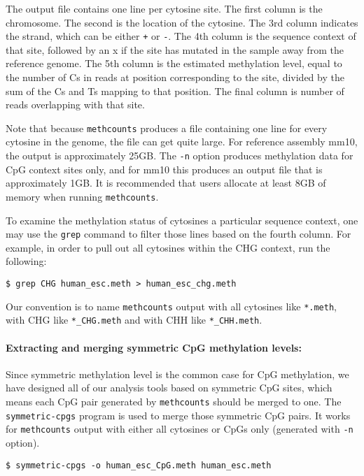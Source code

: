 \documentclass[10pt]{article}
\newcommand{\prog}[1]{\texttt{#1}}
\newcommand{\fn}[1]{\texttt{#1}}
\newcommand{\lit}[1]{\texttt{#1}}
\newcommand{\op}[1]{\texttt{#1}}
\begin{document}
The output file contains one line per cytosine site. The first column is
the chromosome. The second is the location of the cytosine. The 3rd column
indicates the strand, which can be either \lit{+} or \lit{-}. The 4th
column is the sequence context of that site, followed by an x if the
site has mutated in the sample away from the reference genome. The 5th
column is the estimated methylation level, equal to the number of Cs in
reads at position corresponding to the site, divided by the sum of the Cs
and Ts mapping to that position. The final column is number of reads
overlapping with that site.

Note that because \prog{methcounts} produces a file containing one line
for every cytosine in the genome, the file can get quite large. For
reference assembly mm10, the output is approximately 25GB. The \op{-n}
option produces methylation data for CpG context sites only, and for
mm10 this produces an output file that is approximately 1GB. It is
recommended that users allocate at least 8GB of memory when running
\prog{methcounts}.

To examine the methylation status of cytosines a particular sequence
context, one may use the \prog{grep} command to filter those lines
based on the fourth column. For example, in order to pull out all
cytosines within the CHG context, run the following:

\begin{verbatim}
$ grep CHG human_esc.meth > human_esc_chg.meth
\end{verbatim}

Our convention is to name \prog{methcounts} output with all cytosines
like \fn{*.meth}, with CHG like \fn{*\_CHG.meth} and
with CHH like \fn{*\_CHH.meth}.

\paragraph{Extracting and merging symmetric CpG methylation levels:}
\label{sec:symmetric-cpg}
Since symmetric methylation level is the common case for CpG methylation,
we have designed all of our analysis tools based on symmetric CpG sites,
which means each CpG pair generated by \prog{methcounts} should be
merged to one. The \prog{symmetric-cpgs} program is used to merge those
symmetric CpG pairs. It works for \prog{methcounts} output with either
all cytosines or CpGs only (generated with \texttt{-n} option).

\begin{verbatim}
$ symmetric-cpgs -o human_esc_CpG.meth human_esc.meth
\end{verbatim}
\end{document}
